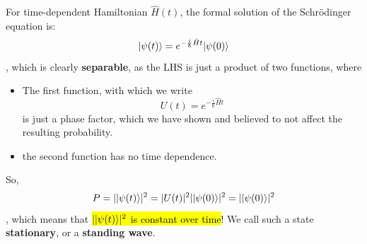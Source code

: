 \documentclass[12pt]{article}
\begin{document}
\begin{proposition}
For time-dependent Hamiltonian $\hat{H}(t)$, the formal solution of the Schrödinger equation is: $$
\Ket{\psi(t)} = e^{-\frac{i}{\hbar}\hat{H}t}\Ket{\psi(0)}
$$, which is clearly \textbf{separable}, as the LHS is just a product of two functions, where
\begin{itemize}
    \item The first function, with which we write $$
    U(t) = e^{-\frac{i}{\hbar}\hat{H}t}
    $$ is just a phase factor, which we have shown and believed to not affect the resulting probability.
    \item the second function has no time dependence.
\end{itemize}
So, $$
P = |\Ket{\psi(t)}|^2 = |U(t)|^2|\Ket{\psi(0)}|^2 = |\Ket{\psi(0)}|^2
$$, which means that \hl{$|\Ket{\psi(t)}|^2$ is constant over time}! We call such a state \textbf{stationary}, or a \textbf{standing wave}.
\end{proposition}
\end{document}
